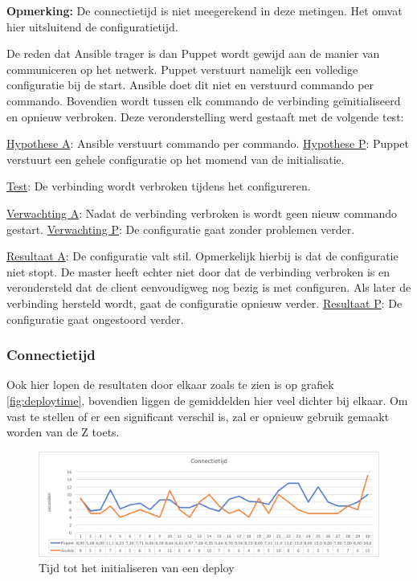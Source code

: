 \textbf{Opmerking:} De \gls{connectietijd} is niet meegerekend in deze metingen. Het omvat hier uitsluitend de \gls{configuratietijd}.

De reden dat Ansible trager is dan Puppet wordt gewijd aan de manier van communiceren op het netwerk. Puppet verstuurt namelijk een volledige configuratie bij de start. Ansible doet dit niet en verstuurd commando per commando. Bovendien wordt tussen elk commando de verbinding ge\"initialiseerd en opnieuw verbroken. Deze veronderstelling werd gestaaft met de volgende test:

\begin{addmargin}[2em]{0cm}
\underline{Hypothese A}: Ansible verstuurt commando per commando.\newline
\underline{Hypothese P}: Puppet verstuurt een gehele configuratie op het momend van de initialisatie.

\underline{Test}: De verbinding wordt verbroken tijdens het configureren.

\underline{Verwachting A}: Nadat de verbinding verbroken is wordt geen nieuw commando gestart.\newline
\underline{Verwachting P}: De configuratie gaat zonder problemen verder.

\underline{Resultaat A}: De configuratie valt stil. Opmerkelijk hierbij is dat de configuratie niet stopt. De master heeft echter niet door dat de verbinding verbroken is en verondersteld dat de client eenvoudigweg nog bezig is met configuren. Als later de verbinding hersteld wordt, gaat de configuratie opnieuw verder.\newline
\underline{Resultaat P}: De configuratie gaat ongestoord verder.
\end{addmargin}



\subsubsection{Connectietijd}
Ook hier lopen de resultaten door elkaar zoals te zien is op grafiek \ref{fig:deploytime}, bovendien liggen de gemiddelden hier veel dichter bij elkaar. Om vast te stellen of er een significant verschil is, zal er opnieuw gebruik gemaakt worden van de Z toets.
\begin{figure}
  \includegraphics[width=\linewidth]{img/connectiontime.png} 
  \caption{Tijd tot het initialiseren van een deploy}  
  \label{fig:connectiontime}
\end{figure}



